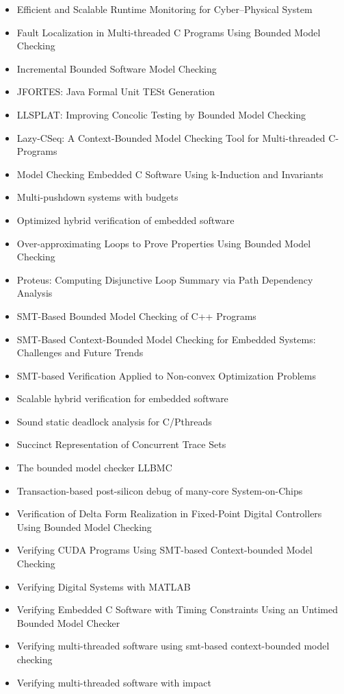 \begin{itemize}
\item Efficient and Scalable Runtime Monitoring for Cyber--Physical System
\item Fault Localization in Multi-threaded C Programs Using Bounded Model Checking
\item Incremental Bounded Software Model Checking
\item JFORTES: Java Formal Unit TESt Generation
\item LLSPLAT: Improving Concolic Testing by Bounded Model Checking
\item Lazy-CSeq: A Context-Bounded Model Checking Tool for Multi-threaded C-Programs
\item Model Checking Embedded C Software Using k-Induction and Invariants
\item Multi-pushdown systems with budgets
\item Optimized hybrid verification of embedded software
\item Over-approximating Loops to Prove Properties Using Bounded Model Checking
\item Proteus: Computing Disjunctive Loop Summary via Path Dependency Analysis
\item SMT-Based Bounded Model Checking of C++ Programs
\item SMT-Based Context-Bounded Model Checking for Embedded Systems: Challenges and Future Trends
\item SMT-based Verification Applied to Non-convex Optimization Problems
\item Scalable hybrid verification for embedded software
\item Sound static deadlock analysis for C/Pthreads
\item Succinct Representation of Concurrent Trace Sets
\item The bounded model checker LLBMC
\item Transaction-based post-silicon debug of many-core System-on-Chips
\item Verification of Delta Form Realization in Fixed-Point Digital Controllers Using Bounded Model Checking
\item Verifying CUDA Programs Using SMT-based Context-bounded Model Checking
\item Verifying Digital Systems with MATLAB
\item Verifying Embedded C Software with Timing Constraints Using an Untimed Bounded Model Checker
\item Verifying multi-threaded software using smt-based context-bounded model checking
\item Verifying multi-threaded software with impact
\end{itemize}

